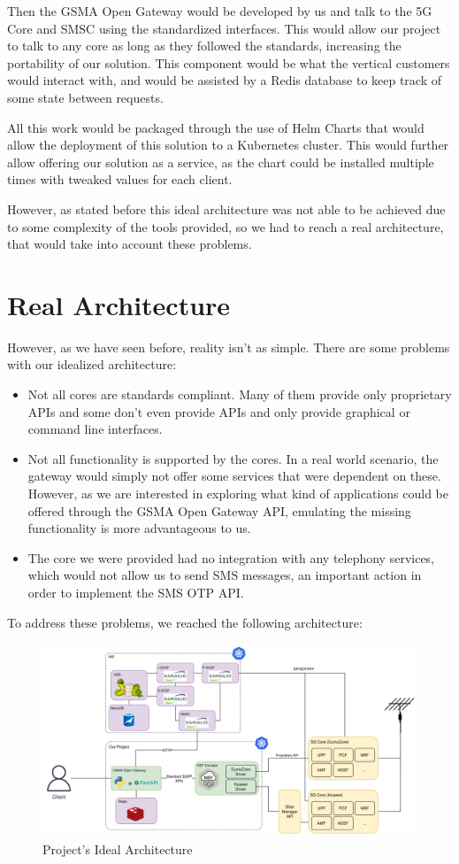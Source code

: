 Then the GSMA Open Gateway would be developed by us and talk to the 5G Core and SMSC using the standardized interfaces. This would allow our project to talk to any core as long as they followed the standards, increasing the portability of our solution. This component would be what the vertical customers would interact with, and would be assisted by a Redis database to keep track of some state between requests.

All this work would be packaged through the use of Helm Charts that would allow the deployment of this solution to a Kubernetes cluster. This would further allow offering our solution as a service, as the chart could be installed multiple times with tweaked values for each client.

However, as stated before this ideal architecture was not able to be achieved due to some complexity of the tools provided, so we had to reach a real architecture, that would take into account these problems.

\section{Real Architecture}

However, as we have seen before, reality isn't as simple. There are some problems with our idealized architecture:
\begin{itemize}
	\item Not all cores are standards compliant. Many of them provide only proprietary APIs and some don't even provide APIs and only provide graphical or command line interfaces.
	\item Not all functionality is supported by the cores. In a real world scenario, the gateway would simply not offer some services that were dependent on these. However, as we are interested in exploring what kind of applications could be offered through the GSMA Open Gateway API, emulating the missing functionality is more advantageous to us.
	\item The core we were provided had no integration with any telephony services, which would not allow us to send SMS messages, an important action in order to implement the SMS OTP API.
\end{itemize}

To address these problems, we reached the following architecture:

\begin{figure}[H]
	\centerline{
		\includegraphics[width=15cm]{figs/RealArchitecture.png}
	}
	\caption{Project's Ideal Architecture}
\end{figure}

